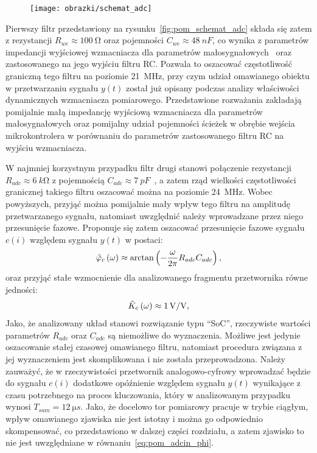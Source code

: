 \begin{figure}[htb!]
\begin{center}
\texttt{[image: obrazki/schemat\_adc]}
\end{center}
\end{figure}

Pierwszy filtr przedstawiony na rysunku~\ref{fig:pom_schemat_adc} składa się zatem z rezystancji $R_{we} \approx \qty{100}{\ohm}$ oraz pojemności $C_{we} \approx \qty{48}{nF}$, co wynika z parametrów impedancji wyjściowej wzmacniacza dla parametrów małosygnałowych~\cite{microchip_application} oraz zastosowanego na jego wyjściu filtru RC. Pozwala to oszacować częstotliwość graniczną tego filtru na poziomie \qty{21}{MHz}, przy czym udział omawianego obiektu w przetwarzaniu sygnału $y(t)$ został już opisany podczas analizy właściwości dynamicznych wzmacniacza pomiarowego. Przedstawione rozważania zakładają pomijalnie małą impedancję wyjściową wzmacniacza dla parametrów małosygnałowych oraz pomijalny udział pojemności ścieżek w obrębie wejścia mikrokontrolera w porównaniu do parametrów zastosowanego filtru RC na wyjściu wzmacniacza.

W najmniej korzystnym przypadku filtr drugi stanowi połączenie rezystancji $R_{adc} \approx \qty{6}{k \ohm}$ z pojemnością $C_{adc} \approx \qty{7}{pF}$~\cite{stm_f411}, a zatem rząd wielkości częstotliwości granicznej takiego filtru oszacować można na poziomie \qty{24}{MHz}. Wobec powyższych, przyjąć można pomijalnie mały wpływ tego filtru na amplitudę przetwarzanego sygnału, natomiast uwzględnić należy wprowadzane przez niego przesunięcie fazowe. Proponuje się zatem oszacować przesunięcie fazowe sygnału $c(i)$ względem sygnału $y(t)$ w postaci:
\begin{equation}
\tilde{\varphi}_{c} \left(\omega\right) \approx \arctan \left(-\frac{\omega}{2\pi} R_{adc} C_{adc}\right) \label{eq:pom_adcin_phi},
\end{equation}
oraz przyjąć stałe wzmocnienie dla analizowanego fragmentu przetwornika równe jedności:
\begin{equation}
\tilde{K}_{c} \left(\omega\right) \approx \qty{1}{V \per V} \label{eq:pom_adcin_amp},
\end{equation}
Jako, że analizowany układ stanowi rozwiązanie typu \enquote{SoC}, rzeczywiste wartości parametrów $R_{adc}$ oraz $C_{adc}$ są niemożliwe do wyznaczenia. Możliwe jest jedynie oszacowanie stałej czasowej omawianego filtru, natomiast procedura związana z jej wyznaczeniem jest skomplikowana i nie została przeprowadzona. Należy zauważyć, że w rzeczywistości przetwornik analogowo-cyfrowy wprowadzać będzie do sygnału $c(i)$ dodatkowe opóźnienie względem sygnału $y(t)$ wynikające z czasu potrzebnego na proces kluczowania, który w analizowanym przypadku wynosi $T_{sam} = \qty{12}{\micro s}$. Jako, że docelowo tor pomiarowy pracuje w trybie ciągłym, wpływ omawianego zjawiska nie jest istotny i można go odpowiednio skompensować, co przedstawiono w dalszej części rozdziału, a zatem zjawisko to nie jest uwzględniane w równaniu~\eqref{eq:pom_adcin_phi}.

